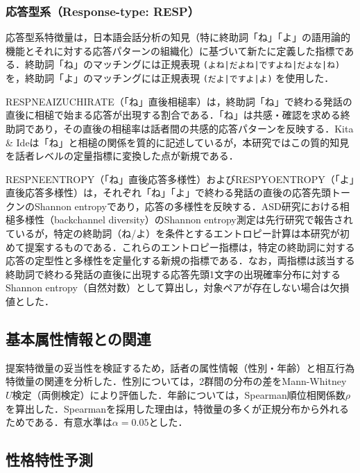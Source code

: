 \documentclass[dvipdfmx,11pt,a4paper]{bxjsarticle}
\renewcommand{\_}{\paperorigunderscore\allowbreak}%
\begin{document}
\subsubsection{応答型系（Response-type: RESP）}
応答型系特徴量は，日本語会話分析の知見（特に終助詞「ね」「よ」の語用論的機能とそれに対する応答パターンの組織化）に基づいて新たに定義した指標である．終助詞「ね」のマッチングには正規表現 \texttt{(よね|だよね|ですよね|だよな|ね)} を，終助詞「よ」のマッチングには正規表現 \texttt{(だよ|ですよ|よ)} を使用した．

RESP\_NE\_AIZUCHI\_RATE（「ね」直後相槌率）は，終助詞「ね」で終わる発話の直後に相槌で始まる応答が出現する割合である．「ね」は共感・確認を求める終助詞であり，その直後の相槌率は話者間の共感的応答パターンを反映する．Kita \& Ide\cite{kita2007}は「ね」と相槌の関係を質的に記述しているが，本研究ではこの質的知見を話者レベルの定量指標に変換した点が新規である．

RESP\_NE\_ENTROPY（「ね」直後応答多様性）およびRESP\_YO\_ENTROPY（「よ」直後応答多様性）は，それぞれ「ね」「よ」で終わる発話の直後の応答先頭トークンのShannon entropyであり，応答の多様性を反映する．ASD研究における相槌多様性（backchannel diversity）のShannon entropy測定は先行研究で報告されているが\cite{wehrle2024}，特定の終助詞（ね/よ）を条件とするエントロピー計算は本研究が初めて提案するものである．これらのエントロピー指標は，特定の終助詞に対する応答の定型性と多様性を定量化する新規の指標である．なお，両指標は該当する終助詞で終わる発話の直後に出現する応答先頭1文字の出現確率分布に対するShannon entropy（自然対数）として算出し，対象ペアが存在しない場合は欠損値とした．


\subsection{基本属性情報との関連}
\label{sec:pred_demographic}

提案特徴量の妥当性を検証するため，話者の属性情報（性別・年齢）と相互行為特徴量の関連を分析した．性別については，2群間の分布の差をMann-Whitney $U$検定（両側検定）により評価した．年齢については，Spearman順位相関係数$\rho$を算出した．Spearmanを採用した理由は，特徴量の多くが正規分布から外れるためである．有意水準は$\alpha = 0.05$とした．

\subsection{性格特性予測}
\label{sec:pred_personality}
\end{document}

